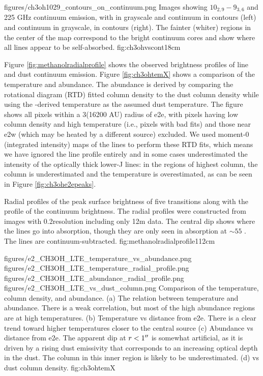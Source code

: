 \documentclass{emulateapj}
\begin{document}
          {figures/ch3oh1029_contours_on_continuum.png}
{Images showing \methanol $10_{2,9}-9_{3,6}$ and 225 GHz continuum emission,
with \methanol in grayscale and continuum in contours (left) and continuum in
grayscale, \methanol in contours (right).  The fainter (whiter) regions in the center
of the \methanol map correspond to the bright continuum cores and show where all lines
appear to be self-absorbed.}
{fig:ch3ohvscont}{1}{8cm}

Figure \ref{fig:methanolradialprofile} shows the observed brightness profiles
of \methanol line and dust continuum emission.
Figure \ref{fig:ch3ohtemX} shows a comparison of the \methanol temperature and
abundance.  The \methanol abundance is derived by comparing the rotational
diagram (RTD) fitted \methanol column density to the dust column density while
using the \methanol-derived temperature as the assumed dust temperature.  The
figure shows all pixels within a 3\arcsec (16200 AU) radius of e2e, with pixels
having low column density and high temperature (i.e., pixels with bad fits) and
those near e2w (which may be heated by a different source) excluded.  We used
moment-0 (integrated intensity) maps of the \methanol lines to perform these
RTD fits, which means we have ignored the line profile entirely and in some
cases underestimated the intensity of the optically thick lower-J lines: in the
regions of highest column, the column is  underestimated and the temperature is
overestimated, as can be seen in Figure \ref{fig:ch3ohe2epeaks}.


{Radial profiles of the peak surface brightness of five \methanol transitions
along with the profile of the continuum brightness.  The radial profiles were
constructed from images with 0.2\arcsec resolution including only 12m data.
The central dip shows where the lines go into absorption, though they are only
seen in absorption at $\sim55$ \kms.  The \methanol lines are
continuum-subtracted.}
{fig:methanolradialprofile}{1}{12cm}

\FigureFour
{figures/e2_CH3OH_LTE_temperature_vs_abundance.png}
{figures/e2_CH3OH_LTE_temperature_radial_profile.png}
{figures/e2_CH3OH_LTE_abundance_radial_profile.png}
{figures/e2_CH3OH_LTE_vs_dust_column.png}
{Comparison of the \methanol temperature, column density, and abundance.
(a) The relation between temperature and abundance.  There is a weak correlation,
but most of the high abundance regions are at high temperatures.
(b) Temperature vs distance from e2e.  There is a clear trend toward higher
temperatures closer  to the central source
(c) Abundance vs distance from e2e.  The apparent dip at $r<1\mbox{$^{\prime\prime}$}$ is
somewhat artificial, as it is driven by a rising dust emissivity that
corresponds to an increasing optical depth in the dust.  The \methanol column
in this inner region is likely to be underestimated. 
(d) \methanol vs dust column density.  }
{fig:ch3ohtemX}
\end{document}

